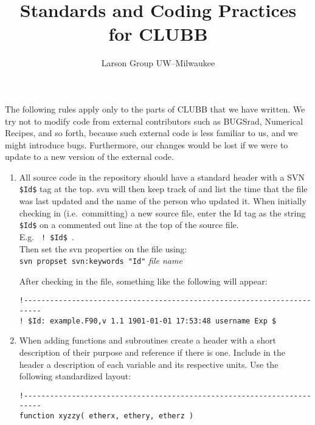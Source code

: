 \documentclass[letterpaper,12pt]{article}
\begin{document}
\title{\textbf{Standards and Coding Practices for CLUBB}}
\author{Larson Group UW--Milwaukee}

\maketitle


The following rules apply only to the parts of CLUBB that we have written.  We try not to modify
code from external contributors such as BUGSrad, 
Numerical Recipes, and so forth, because such external code is
less familiar to us, and we might introduce bugs.  Furthermore, our changes would be lost if
we were to update to a new version of the external code.
\newline


\begin{enumerate}
\item All source code in the repository should 
have a standard header with a SVN \texttt{\$Id\$} tag at the top.  svn will then
keep track of and list the time that the file was last updated and the name of
the person who updated it.  
\newline
When initially checking in (i.e.~committing) a new source file, enter the Id tag as 
the string \texttt{\$Id\$} on a commented out line at the top of the 
source file. \\
E.g. \verb| ! $Id$ |. \\
Then set the svn properties on the file using: \\
\verb|svn propset svn:keywords "Id"| \textsl{file name}

\bigskip

After checking in the file, something like the following will appear:
\begin{verbatim}
!-----------------------------------------------------------------------
! $Id: example.F90,v 1.1 1901-01-01 17:53:48 username Exp $

\end{verbatim}

\item When adding functions and subroutines create a header with a short 
description of their purpose and reference if there is one.  Include 
in the header a description of 
each variable and its respective units.  Use the following standardized
layout: 

\begin{verbatim}
!-----------------------------------------------------------------------
function xyzzy( etherx, ethery, etherz )


\end{verbatim}
\end{enumerate}
\end{document}
